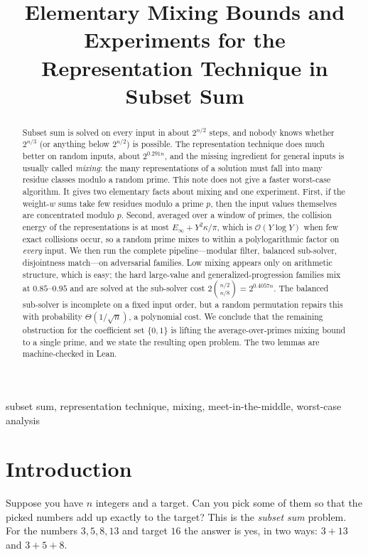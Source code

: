 \documentclass[conference]{IEEEtran}
\title{Elementary Mixing Bounds and Experiments for the\\
Representation Technique in Subset Sum}
\author{\IEEEauthorblockN{Le Duc Minh}
\IEEEauthorblockA{\href{mailto:minh.leduc.0210@gmail.com}{minh.leduc.0210@gmail.com}}}
\newcommand{\Oh}{\mathcal{O}}
\begin{document}
\maketitle
\begin{abstract}
Subset sum is solved on every input in about $2^{n/2}$ steps, and nobody knows
whether $2^{n/3}$ (or anything below $2^{n/2}$) is possible. The representation
technique does much better on random inputs, about $2^{0.291n}$, and the missing
ingredient for general inputs is usually called \emph{mixing}: the many
representations of a solution must fall into many residue classes modulo a
random prime. This note does not give a faster worst-case algorithm. It gives
two elementary facts about mixing and one experiment. First, if the weight-$w$
sums take few residues modulo a prime $p$, then the input values themselves are
concentrated modulo $p$. Second, averaged over a window of primes, the collision
energy of the representations is at most $E_\infty+Y^2\kappa/\pi$, which is
$\Oh(Y\log Y)$ when few exact collisions occur, so a random prime mixes to within
a polylogarithmic factor on \emph{every} input. We then run the complete
pipeline---modular filter, balanced sub-solver, disjointness match---on
adversarial families. Low mixing appears only on arithmetic structure, which is
easy; the hard large-value and generalized-progression families mix at
$0.85$--$0.95$ and are solved at the sub-solver cost
$2\binom{n/2}{n/8}=2^{0.4057n}$. The balanced sub-solver is incomplete on a fixed input order, but a random
permutation repairs this with probability $\Theta(1/\sqrt n)$, a polynomial
cost. We conclude that the remaining obstruction for the coefficient set
$\{0,1\}$ is lifting the average-over-primes mixing bound to a single prime, and
we state the resulting open problem. The two lemmas are
machine-checked in Lean.
\end{abstract}
\begin{IEEEkeywords}
subset sum, representation technique, mixing, meet-in-the-middle, worst-case
analysis
\end{IEEEkeywords}

\section{Introduction}
Suppose you have $n$ integers and a target. Can you pick some of them so that the
picked numbers add up exactly to the target? This is the \emph{subset sum}
problem. For the numbers $3,5,8,13$ and target $16$ the answer is yes, in two
ways: $3+13$ and $3+5+8$.
\end{document}
